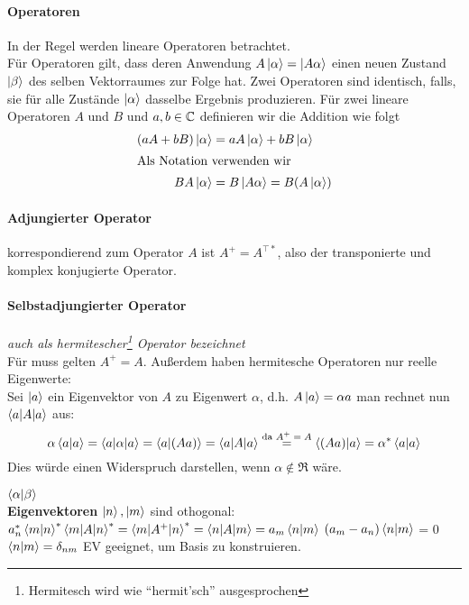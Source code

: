 \begin{definition*}[Hilbertraum]
	\paragraph{Operatoren} In der Regel werden lineare Operatoren betrachtet.\\
	Für Operatoren gilt, dass deren Anwendung $A \ket{\alpha} = \ket{A \alpha}$ einen neuen Zustand $\ket{\beta}$ des selben Vektorraumes zur Folge hat. Zwei Operatoren sind identisch, falls, sie für alle Zustände $\ket{\alpha}$ dasselbe Ergebnis produzieren. Für zwei lineare Operatoren $A$ und $B$ und $a,b \in \mathbb{C}$ definieren wir die Addition wie folgt
	\begin{align*}
		(a A + b B) \ket{\alpha} &= a A \ket{\alpha} + b B\ket{\alpha}\\
		\intertext{Als Notation verwenden wir}
		B A \ket{\alpha} &= B \ket{A \alpha} = B (A \ket{\alpha})
	\end{align*}
	
	\paragraph{Adjungierter Operator} korrespondierend zum Operator $A$ ist $A^+ = A^{\top \ast}$, also der transponierte und komplex konjugierte Operator.
	\paragraph{Selbstadjungierter Operator} \textit{auch als hermitescher\footnote{Hermitesch wird wie "`hermit'sch"' ausgesprochen} Operator bezeichnet}\\
	Für muss gelten $A^+ = A$. Außerdem haben hermitesche Operatoren nur reelle Eigenwerte:\\
	Sei $\ket a$ ein Eigenvektor von $A$ zu Eigenwert $\alpha$, d.h. $A \ket{a} = \alpha a$ man rechnet nun $\braket{a | A | a}$ aus:
	$$\alpha \braket{a | a} = \braket{a | \alpha | a} = \braket{a | (A a)} = \braket{a | A | a} \overset{\text{da $A^+ = A$}}{=} \braket{(A a) | a} = \alpha^\ast \braket{a | a}$$
	Dies würde einen Widerspruch darstellen, wenn $\alpha \notin \Re$ wäre.
\end{definition*}



$\braket{\alpha | \beta}$\\
\textbf{Eigenvektoren} $\ket{n}, \ket{m}$ sind othogonal:
$a_n^\ast \braket{m | n}^\ast \braket{m | A | n}^\ast = \braket{m | A^+ | n}^\ast = \braket{n | A | m} = a_m \braket{n | m}$
\conseq $(a_m - a_n) \braket{n | m}$ = 0\conseq $\braket{n | m} = \delta_{nm}$ \conseq EV geeignet, um Basis zu konstruieren.

